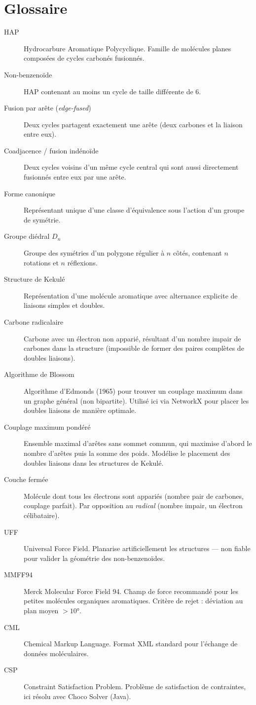 \documentclass[a4paper,12pt]{article}
\begin{document}
\section{Glossaire}

\begin{description}
  \item[HAP] Hydrocarbure Aromatique Polycyclique. Famille de molécules planes composées de
    cycles carbonés fusionnés.
  \item[Non-benzenoïde] HAP contenant au moins un cycle de taille différente de 6.
  \item[Fusion par arête (\textit{edge-fused})] Deux cycles partagent exactement une arête
    (deux carbones et la liaison entre eux).
  \item[Coadjacence / fusion indénoïde] Deux cycles voisins d'un même cycle central qui sont
    aussi directement fusionnés entre eux par une arête.
  \item[Forme canonique] Représentant unique d'une classe d'équivalence sous l'action d'un
    groupe de symétrie.
  \item[Groupe diédral $D_n$] Groupe des symétries d'un polygone régulier à $n$ côtés,
    contenant $n$ rotations et $n$ réflexions.
  \item[Structure de Kekulé] Représentation d'une molécule aromatique avec alternance
    explicite de liaisons simples et doubles.
  \item[Carbone radicalaire] Carbone avec un électron non apparié, résultant d'un nombre
    impair de carbones dans la structure (impossible de former des paires complètes de
    doubles liaisons).
  \item[Algorithme de Blossom] Algorithme d'Edmonds (1965) pour trouver un couplage maximum
    dans un graphe général (non bipartite). Utilisé ici via NetworkX pour placer les doubles
    liaisons de manière optimale.
  \item[Couplage maximum pondéré] Ensemble maximal d'arêtes sans sommet commun, qui maximise
    d'abord le nombre d'arêtes puis la somme des poids. Modélise le placement des doubles
    liaisons dans les structures de Kekulé.
  \item[Couche fermée] Molécule dont tous les électrons sont appariés (nombre pair de carbones,
    couplage parfait). Par opposition au \textit{radical} (nombre impair, un électron
    célibataire).
  \item[UFF] Universal Force Field. Planarise artificiellement les structures — non fiable
    pour valider la géométrie des non-benzenoïdes.
  \item[MMFF94] Merck Molecular Force Field 94. Champ de force recommandé pour les petites
    molécules organiques aromatiques. Critère de rejet : déviation au plan moyen $> 10°$.
  \item[CML] Chemical Markup Language. Format XML standard pour l'échange de données
    moléculaires.
  \item[CSP] Constraint Satisfaction Problem. Problème de satisfaction de contraintes, ici
    résolu avec Choco Solver (Java).
\end{description}
\end{document}
